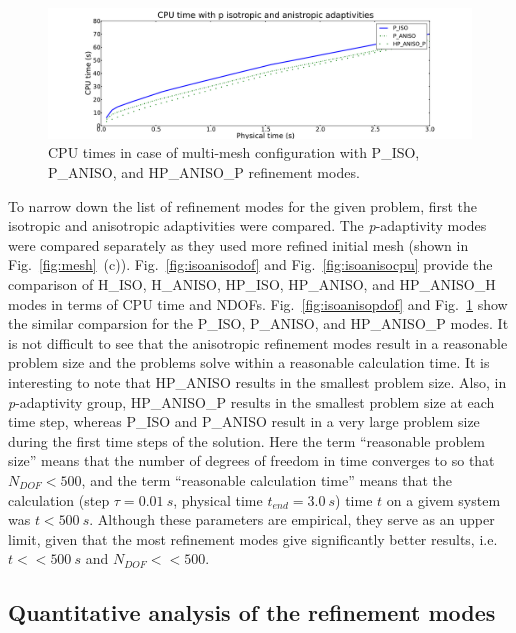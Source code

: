 \begin{figure}[!ht]
  \begin{centering}
  \includegraphics[width=\columnwidth]{isoanisop_cpu}
  \caption{\label{fig:isoanisopcpu} CPU times in case 
  of multi-mesh configuration with P\_ISO, P\_ANISO, and
  HP\_ANISO\_P refinement modes.}
  \end{centering}
\end{figure}
To narrow down the list of refinement modes for the given problem, first the
isotropic and anisotropic adaptivities were compared. The \emph{p}-adaptivity
modes were compared separately as they used more refined initial mesh 
(shown in Fig.~\ref{fig:mesh}~(c)).
Fig.~\ref{fig:isoanisodof} and Fig.~\ref{fig:isoanisocpu} provide the comparison
of H\_ISO, H\_ANISO, HP\_ISO, HP\_ANISO, and HP\_ANISO\_H modes in terms of CPU time
and NDOFs.
Fig.~\ref{fig:isoanisopdof} and Fig.~\ref{fig:isoanisopcpu} show the similar
comparsion for the P\_ISO, P\_ANISO, and HP\_ANISO\_P modes.
It is not difficult to see that the anisotropic refinement modes result in a reasonable problem
size and the problems solve within a reasonable calculation time. It is interesting
to note that HP\_ANISO results in the smallest problem size. Also, in
\emph{p}-adaptivity group, HP\_ANISO\_P results in the smallest problem size
at each time step, whereas P\_ISO and P\_ANISO result in a very large problem size
during the first time steps of the solution.
Here the term ``reasonable problem size''
means that the number of degrees of freedom in time converges
to so that $N_{DOF}<500$, and the term ``reasonable calculation time''
means that the calculation (step $\tau=0.01\ s$, physical
time $t_{end}=3.0\ s$) time $t$ on a givem system was $t<500\ s$.
Although these parameters are empirical, they serve as an upper limit, given
that the most refinement modes give significantly better results, i.e.
$t<<500\ s$ and $N_{DOF} << 500$.

\subsection{Quantitative analysis of the refinement modes}

